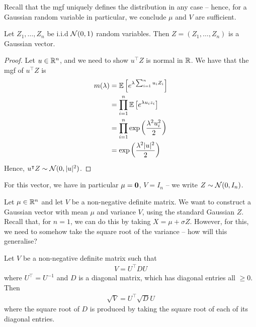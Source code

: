 \documentclass{../template/note}
\begin{document}
    Recall that the mgf uniquely defines the distribution in any case -- hence, for a Gaussian random variable in particular, we conclude \(\mu\) and \(V\) are sufficient.
    
    \begin{lemma}
        Let \(Z_1, \dots, Z_n\) be i.i.d \(\mathcal{N}(0, 1)\) random variables. Then \(Z = (Z_1, \dots, Z_n)\) is a Gaussian vector.
    \end{lemma}
    
    \begin{proof}
        Let \(u \in \mathbb R^n\), and we need to show \(u^\intercal Z\) is normal in \(\mathbb R\). We have that the mgf of \(u^\intercal Z\) is
        \begin{align*}
            m(\lambda) &= \mathbb E\left[e^{\lambda \sum_{i=1}^n u_iZ_i}\right] \\
            &= \prod_{i=1}^n \mathbb E\left[e^{\lambda u_i z_i}\right] \\
            &= \prod_{i=1}^n \exp\left(\frac{\lambda^2u_i^2}2\right) \\
            &= \exp\left(\frac{\lambda^2|u|^2}2\right)
        \end{align*}
        Hence, \(u^\intercal Z \sim \mathcal{N}(0, |u|^2)\).
    \end{proof}
    
    \begin{remark*}
        For this vector, we have in particular \(\mu = \V 0\), \(V = I_n\) -- we write \(Z \sim \mathcal{N}(0, I_n)\).
    \end{remark*}
    
    Let \(\mu \in \mathbb R^n\) and let \(V\) be a non-negative definite matrix. We want to construct a Gaussian vector with mean \(\mu\) and variance \(V\), using the standard Gaussian \(Z\). Recall that, for \(n=1\), we can do this by taking \(X = \mu + \sigma Z\). However, for this, we need to somehow take the square root of the variance -- how will this generalise?

    \begin{definition}
        Let \(V\) be a non-negative definite matrix such that
        \begin{align*}
            V = U^\intercal D U
        \end{align*}
        where \(U^\intercal = U^{-1}\) and \(D\) is a diagonal matrix, which has diagonal entries all \(\geq 0\). Then
        \begin{align*}
            \sqrt V = U^\intercal \sqrt D U
        \end{align*}
        where the square root of \(D\) is produced by taking the square root of each of its diagonal entries.       
    \end{definition}
    
\end{document}

